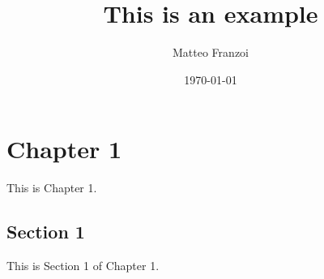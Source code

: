 \documentclass{book}
\author{Matteo Franzoi}
\date{\today}
\title{This is an example}
\begin{document}
\maketitle
\chapter{Chapter 1}
This is Chapter 1.
\section{Section 1}
This is Section 1 of Chapter 1.
\end{document}
